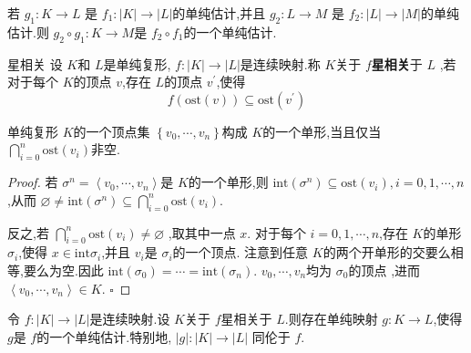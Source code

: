 \documentclass[../../几何与拓扑.tex]{subfiles}
\begin{document}
\begin{proposition}
    若 \(  g_1: K\to L  \) 是 \(  f_1: \left| K \right|\to \left| L \right|    \)的单纯估计,并且 \(  g_2: L \to M  \)  是 \(  f_2: \left| L \right|\to \left| M \right|    \)的单纯估计.则 
    \(  g_2\circ g_1: K\to M  \)是 \(  f_2\circ f_1  \)的一个单纯估计.   
\end{proposition}


\begin{definition}{星相关}
    设 \(  K  \)和 \(  L  \)是单纯复形, \(  f: \left| K \right|\to \left| L \right|    \)是连续映射.称 \(  K  \)关于 \(  f  \)\textbf{星相关}于 \(  L  \)      ,若对于每个 \(  K  \)的顶点 \(  v  \),存在 \(  L  \)的顶点 \(  v^{\prime}   \),使得 \[
    f\left( \mathrm{ost}\left( v \right)  \right)\subseteq  \mathrm{ost}\left( v^{\prime}  \right)  
    \]    
\end{definition}

\begin{proposition}
    单纯复形 \(  K  \)的一个顶点集 \(  \left\{  v_0,\cdots,v_{n}    \right\}  \)构成 \(  K  \)的一个单形,当且仅当 \(  \bigcap_{i= 0}^{n} \mathrm{ost}\left( v_{i} \right)    \)非空.    
\end{proposition}

\begin{proof}

    若 \(   \sigma ^{n} =  \left< v_0,\cdots,v_{n}    \right>  \)是 \(  K  \)的一个单形,则 \(  \mathrm{int}\left(  \sigma ^{n} \right)\subseteq  \mathrm{ost}\left( v_{i} \right),i =  0, 1,\cdots,n     \),从而 \(  \varnothing\neq  \mathrm{int}\left(  \sigma ^{n} \right)\subseteq  \bigcap_{i= 0}^{n} \mathrm{ost}\left( v_{i} \right)     \).
    
    反之,若 \(  \bigcap_{i= 0}^{n} \mathrm{ost}\left( v_{i} \right)\neq \varnothing    \) ,取其中一点 \(  x  \).
    对于每个 \(  i = 0, 1,\cdots,n   \),存在 \(  K  \)的单形 \(   \sigma _{i}  \),使得 \(  x \in \mathrm{int} \sigma _{i}  \),并且 \(  v_{i}  \)是 \(   \sigma _i   \)的一个顶点.      注意到任意 \(  K  \)的两个开单形的交要么相等,要么为空.因此 \(  \mathrm{int}\left(  \sigma _0  \right)= \cdots = \mathrm{int}\left(  \sigma _{n} \right)    \).   
     \(   v_0,\cdots,v_{n}     \)均为 \(   \sigma _0   \)的顶点  ,进而 \(  \left<  v_0,\cdots,v_{n}    \right> \in K  \). 
    \hfill $\square$
\end{proof}

\begin{theorem}\label{star-related-Simp-Appro-thm}
    令 \(  f: \left| K \right| \to \left| L \right|    \)是连续映射.设 \(  K  \)关于 \(  f  \)星相关于 \(  L  \).则存在单纯映射 \(  g: K\to L  \),使得 \(  g  \)是 \(  f  \)的一个单纯估计.特别地, \(  \left| g \right|: \left| K \right|\to \left| L \right|     \)        同伦于 \(  f  \). 
\end{theorem}
\end{document}
